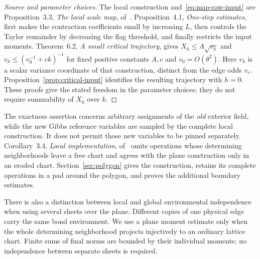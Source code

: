\begin{proof}[Source and parameter choices]
The local construction and~\eqref{eq:map-raw-input} are Proposition~3.3,
\emph{The local scale map}, of~\cite{Q}.  Proposition~4.1,
\emph{One-step estimates}, first makes the contraction coefficients
small by increasing $L$, then controls the Taylor remainder by decreasing
the flag threshold, and finally restricts the input moments.
Theorem~6.2, \emph{A small critical trajectory}, gives
$X_k\le A\sqrt{v_k}$ and
$v_k\le(v_0^{-1}+ck)^{-1}$ for fixed positive constants $A,c$ and
$v_0=O(\theta^2)$.  Here $v_k$ is a scalar variance coordinate of that
construction, distinct from the edge odds $v_e$.
Proposition~\ref{prop:critical-input} identifies the resulting trajectory
with $h=0$.  These proofs give the stated freedom in the parameter
choices; they do not require summability of $X_k$ over $k$.
\end{proof}

The exactness assertion concerns arbitrary assignments of the \emph{old}
exterior field, while the new Gibbs reference variables are sampled by
the complete local construction.  It does not permit those new variables
to be pinned separately.  Corollary~3.4, \emph{Local implementation},
of~\cite{Q} omits operations whose determining neighborhoods leave a
free chart and agrees with the plane construction only in an eroded
chart.  Section~\ref{sec:polygon} gives the construction, retains its
complete operations in a pad around the polygon, and proves the
additional boundary estimates.

There is also a distinction between local and global environmental
independence when using several sheets over the plane.  Different copies
of one physical edge carry the same bond environment.  We use a plane
moment estimate only when the whole determining neighborhood projects
injectively to an ordinary lattice chart.  Finite sums of final norms
are bounded by their individual moments; no independence between
separate sheets is required.
